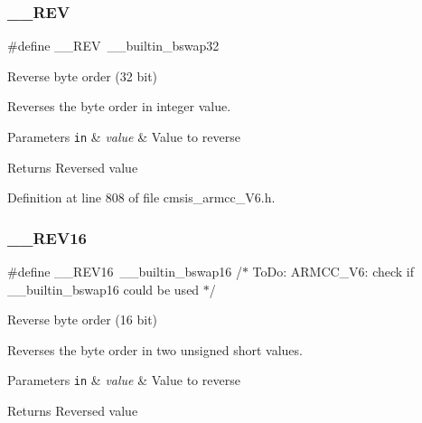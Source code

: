 \subsubsection{\texorpdfstring{\+\_\+\+\_\+\+R\+EV}{\_\_REV}\hspace{0.1cm}{\footnotesize\ttfamily [2/2]}}
{\footnotesize\ttfamily \#define \+\_\+\+\_\+\+R\+EV~\+\_\+\+\_\+builtin\+\_\+bswap32}



Reverse byte order (32 bit) 

Reverses the byte order in integer value. 
\begin{DoxyParams}[1]{Parameters}
\mbox{\tt in}  & {\em value} & Value to reverse \\
\hline
\end{DoxyParams}
\begin{DoxyReturn}{Returns}
Reversed value 
\end{DoxyReturn}


Definition at line 808 of file cmsis\+\_\+armcc\+\_\+\+V6.\+h.

\mbox{\label{group___c_m_s_i_s___core___instruction_interface_ga4e3acd41e7667cdf65ffcd8c76a8613f}} 
\subsubsection{\texorpdfstring{\+\_\+\+\_\+\+R\+E\+V16}{\_\_REV16}}
{\footnotesize\ttfamily \#define \+\_\+\+\_\+\+R\+E\+V16~\+\_\+\+\_\+builtin\+\_\+bswap16                           /$\ast$ To\+Do\+:  A\+R\+M\+C\+C\+\_\+\+V6\+: check if \+\_\+\+\_\+builtin\+\_\+bswap16 could be used $\ast$/}



Reverse byte order (16 bit) 

Reverses the byte order in two unsigned short values. 
\begin{DoxyParams}[1]{Parameters}
\mbox{\tt in}  & {\em value} & Value to reverse \\
\hline
\end{DoxyParams}
\begin{DoxyReturn}{Returns}
Reversed value 
\end{DoxyReturn}


